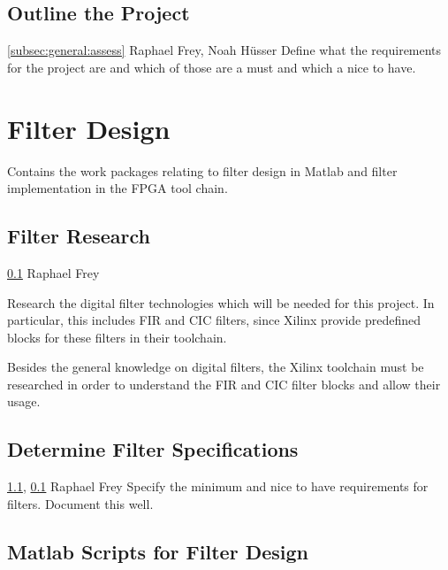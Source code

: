 \documentclass[a4paper,oneside]{alpenspecs/alpenspecs}
\begin{document}
\subsection{Outline the Project}
\label{subsec:general:outline}

\wpac
    {}
    {}
    {}
    {\ref{subsec:general:assess}}
    {}
    {Raphael Frey, Noah Hüsser}
    {%
        Define what the requirements for the project are and which of those are a must and which a nice to have.
    }

\section{Filter Design}
\label{sec:filters}

Contains the  work packages  relating to  filter design  in Matlab  and filter
implementation in the FPGA tool chain.

\subsection{Filter Research}
\label{subsec:filter:research}

\wpac
    {}
    {}
    {}
    {\ref{subsec:general:outline}}
    {}
    {Raphael Frey}
    {%
        Research the digital filter technologies which will be needed for this
        project. In particular, this includes FIR and CIC filters, since Xilinx
        provide predefined blocks for these filters in their toolchain.

        Besides the general knowledge on digital filters, the Xilinx toolchain
        must be researched in order to understand the FIR and CIC filter blocks
        and allow their usage.
    }

\subsection{Determine Filter Specifications}
\label{subsec:filter:specification}

\wpac
    {}
    {}
    {}
    {\ref{subsec:filter:research}, \ref{subsec:general:outline}}
    {}
    {Raphael Frey}
    {%
        Specify the minimum and nice to have requirements for filters.
        Document this well.
    }

\subsection{Matlab Scripts for Filter Design}
\label{subsec:filter:matlab}
\end{document}
